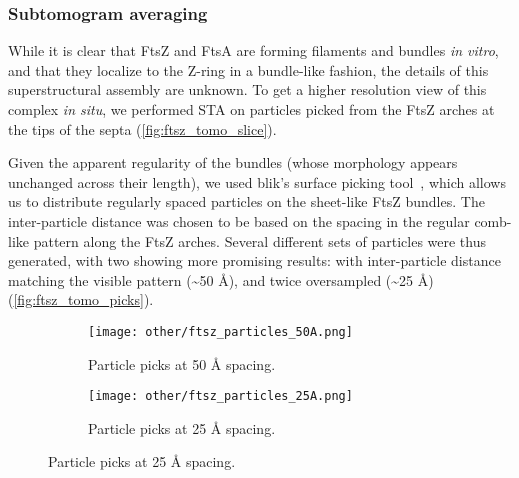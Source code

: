 \subsubsection{Subtomogram averaging}

While it is clear that FtsZ and FtsA are forming filaments and bundles \textit{in vitro}, and that they localize to the Z-ring in a bundle-like fashion, the details of this superstructural assembly are unknown.
To get a higher resolution view of this complex \textit{in situ}, we performed STA on particles picked from the FtsZ arches at the tips of the septa (\autoref{fig:ftsz_tomo_slice}).

Given the apparent regularity of the bundles (whose morphology appears unchanged across their length), we used blik's surface picking tool~\cite{gaifasBlikExtensible3D2024,gaifasBlikPythonTool2024}, which allows us to distribute regularly spaced particles on the sheet-like FtsZ bundles.
The inter-particle distance was chosen to be based on the spacing in the regular comb-like pattern along the FtsZ arches.
Several different sets of particles were thus generated, with two showing more promising results: with inter-particle distance matching the visible pattern (\sim50 Å), and twice oversampled (\sim25 Å) (\autoref{fig:ftsz_tomo_picks}).

\begin{figure}
    \centering
    \begin{subfigure}[B]{.49\textwidth}
        \centering
        \texttt{[image: other/ftsz\_particles\_50A.png]}
        \caption{Particle picks at 50 Å spacing.}
        \label{fig:ftsz_tomo_picks_50}
    \end{subfigure}%
    \hfill
    \begin{subfigure}[B]{.49\textwidth}
        \centering
        \texttt{[image: other/ftsz\_particles\_25A.png]}
        \caption{Particle picks at 25 Å spacing.}
        \label{fig:ftsz_tomo_picks_25}
    \end{subfigure}%
    \label{fig:ftsz_tomo_picks}
\end{figure}

